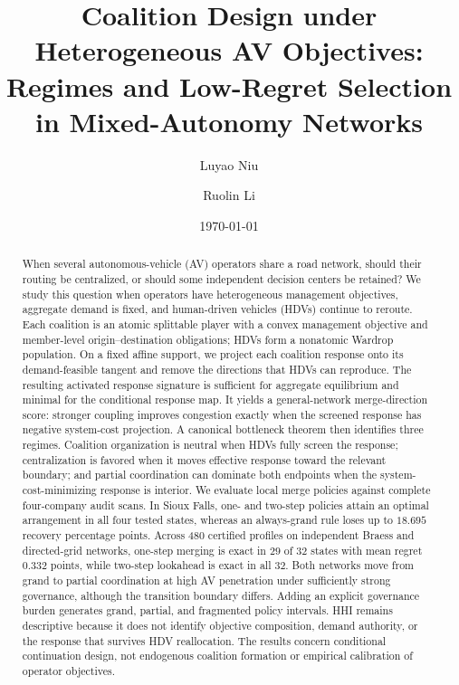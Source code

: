\documentclass[11pt]{article}
\title{\textbf{Coalition Design under Heterogeneous AV Objectives: Regimes and Low-Regret Selection in Mixed-Autonomy Networks}}
\author{Luyao Niu \and Ruolin Li}
\date{\today}
\begin{document}
\maketitle

\begin{abstract}\sloppy
When several autonomous-vehicle (AV) operators share a road network, should
their routing be centralized, or should some independent decision centers be
retained? We study this question when operators have heterogeneous management
objectives, aggregate demand is fixed, and human-driven vehicles (HDVs)
continue to reroute. Each coalition is an atomic splittable player with a
convex management objective and member-level origin--destination obligations;
HDVs form a nonatomic Wardrop population. On a fixed affine support, we project
each coalition response onto its demand-feasible tangent and remove the
directions that HDVs can reproduce. The resulting activated response signature
is sufficient for aggregate equilibrium and minimal for the conditional
response map. It yields a general-network merge-direction score: stronger
coupling improves congestion exactly when the screened response has negative
system-cost projection. A canonical bottleneck theorem then identifies three
regimes. Coalition organization is neutral when HDVs fully screen the response;
centralization is favored when it moves effective response toward the relevant
boundary; and partial coordination can dominate both endpoints when the
system-cost-minimizing response is interior. We evaluate local merge policies
against complete four-company audit scans. In Sioux Falls, one- and two-step
policies attain an optimal arrangement in all four tested states, whereas an
always-grand rule loses up to $18.695$ recovery percentage points. Across 480
certified profiles on independent Braess and directed-grid networks, one-step
merging is exact in $29$ of $32$ states with mean regret $0.332$ points, while
two-step lookahead is exact in all $32$. Both networks move from grand to
partial coordination at high AV penetration under sufficiently strong
governance, although the transition boundary differs. Adding an explicit
governance burden generates grand, partial, and fragmented policy intervals.
HHI remains descriptive because it does not identify objective composition,
demand authority, or the response that survives HDV reallocation. The results
concern conditional continuation design, not endogenous coalition formation or
empirical calibration of operator objectives.
\end{abstract}
\end{document}
